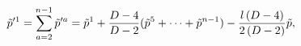 \begin{equation}
\tilde p^{\prime 1} =\sum_{a=2}^{n-1} \tilde p^{\prime a}= \tilde p^1+{D-4\over
D-2}(
\tilde p^{5}+\dots + \tilde p^{n-1}) -{l\, (D-4)\over 2\, (D-2)} \tilde p, 
\end{equation} 
